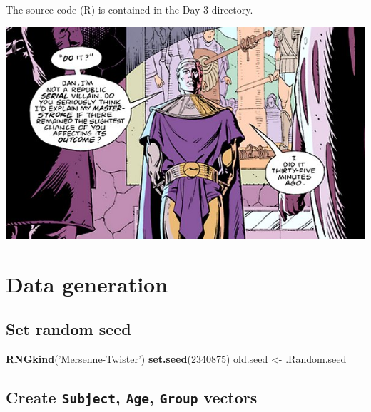 \documentclass[]{article}
\newenvironment{Shaded}{\begin{snugshade}}{\end{snugshade}}
\newcommand{\KeywordTok}[1]{\textcolor[rgb]{0.13,0.29,0.53}{\textbf{{#1}}}}
\newcommand{\DecValTok}[1]{\textcolor[rgb]{0.00,0.00,0.81}{{#1}}}
\newcommand{\StringTok}[1]{\textcolor[rgb]{0.31,0.60,0.02}{{#1}}}
\newcommand{\NormalTok}[1]{{#1}}
\begin{document}
The source code (R) is contained in the Day 3 directory.

\includegraphics{ozymandias-by-gibbons.jpg}

\section{Data generation}\label{data-generation}

\subsection{Set random seed}\label{set-random-seed}

\begin{Shaded}
\begin{Highlighting}[]
\KeywordTok{RNGkind}\NormalTok{(}\StringTok{'Mersenne-Twister'}\NormalTok{)}
\KeywordTok{set.seed}\NormalTok{(}\DecValTok{2340875}\NormalTok{)}
\NormalTok{old.seed <-}\StringTok{ }\NormalTok{.Random.seed}
\end{Highlighting}
\end{Shaded}

\subsection{\texorpdfstring{Create \texttt{Subject}, \texttt{Age},
\texttt{Group}
vectors}{Create Subject, Age, Group vectors}}\label{create-subject-age-group-vectors}
\end{document}
